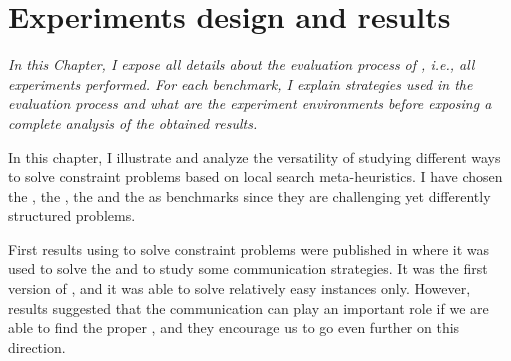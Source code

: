 \chapter{Experiments design and results}
\label{chap:expe}
\textit{In this Chapter, I expose all details about the evaluation process of \posl{}, i.e., all experiments performed. For each benchmark, I explain strategies used in the evaluation process and what are the experiment environments before exposing a complete analysis of the obtained results.}
\vfill
\minitoc
\newpage

In this chapter, I illustrate and analyze the versatility of \posl{} studying different ways to solve constraint problems based on local search meta-heuristics. 
I have chosen the \sgp, the \nqp, the \carrp{} and the \grp{} as benchmarks since they are challenging yet differently structured problems. 


First results using \posl{} to solve constraint problems were published in \cite{Reyes-amaro} where it was used to solve the \sgp{} and to study some communication strategies. It was the first version of \posl{}, and it was able to solve relatively easy instances only. However, results suggested that the communication can play an important role if we are able to find the proper \commstr{}, and they encourage us to go even further on this direction. %

